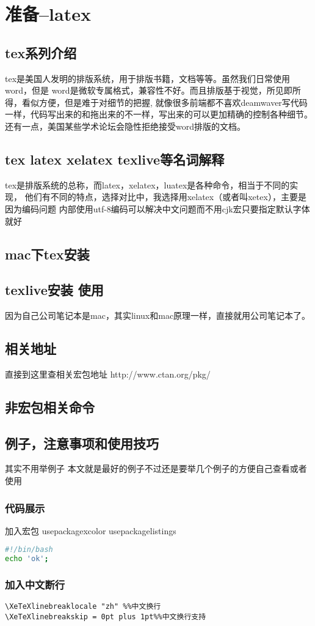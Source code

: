 \section{准备--latex}
\subsection{tex系列介绍}
 tex是美国人发明的排版系统，用于排版书籍，文档等等。虽然我们日常使用word，但是
 word是微软专属格式，兼容性不好。而且排版基于视觉，所见即所得，看似方便，但是难于对细节的把握,
 就像很多前端都不喜欢deamwaver写代码一样，代码写出来的和拖出来的不一样，写出来的可以更加精确的控制各种细节。
 还有一点，美国某些学术论坛会隐性拒绝接受word排版的文档。
\subsection{tex latex xelatex texlive等名词解释}
 tex是排版系统的总称，而latex，xelatex，luatex是各种命令，相当于不同的实现，
 他们有不同的特点，选择对比中，我选择用xelatex（或者叫xetex），主要是因为编码问题
 内部使用utf-8编码可以解决中文问题而不用cjk宏只要指定默认字体就好
\subsection{mac下tex安装}
\subsection{texlive安装 使用}
因为自己公司笔记本是mac，其实linux和mac原理一样，直接就用公司笔记本了。\newline
\subsection{相关地址}
直接到这里查相关宏包地址 http://www.ctan.org/pkg/
\subsection{非宏包相关命令}
\subsection{例子，注意事项和使用技巧}
其实不用举例子 本文就是最好的例子不过还是要举几个例子的方便自己查看或者使用
\subsubsection{代码展示}
加入宏包
usepackage{xcolor}%
usepackage{listings}%
\begin{lstlisting}[language=bash]
#!/bin/bash
echo 'ok';
\end{lstlisting}
\subsubsection{加入中文断行}
\begin{lstlisting}[language=Tex]
\XeTeXlinebreaklocale "zh" %%中文换行
\XeTeXlinebreakskip = 0pt plus 1pt%%中文换行支持
\end{lstlisting}





